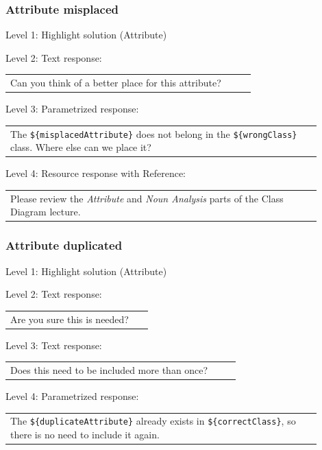 \subsubsection{Attribute misplaced}

\noindent Level 1: Highlight solution (Attribute) \medskip

\noindent Level 2: Text response: \medskip

\begin{tabular}{|p{0.9\linewidth}}
Can you think of a better place for this attribute?
\end{tabular} \medskip

\noindent Level 3: Parametrized response: \medskip

\begin{tabular}{|p{0.9\linewidth}}
The \verb|${misplacedAttribute}| does not belong in the \verb|${wrongClass}| class. Where else can we place it?
\end{tabular} \medskip

\noindent Level 4: Resource response with Reference: \medskip

\begin{tabular}{|p{0.9\linewidth}}
Please review the \textit{Attribute} and \textit{Noun Analysis} parts of the Class Diagram lecture.
\end{tabular} \medskip


\subsubsection{Attribute duplicated}

\noindent Level 1: Highlight solution (Attribute) \medskip

\noindent Level 2: Text response: \medskip

\begin{tabular}{|p{0.9\linewidth}}
Are you sure this is needed?
\end{tabular} \medskip

\noindent Level 3: Text response: \medskip

\begin{tabular}{|p{0.9\linewidth}}
Does this need to be included more than once?
\end{tabular} \medskip

\noindent Level 4: Parametrized response: \medskip

\begin{tabular}{|p{0.9\linewidth}}
The \verb|${duplicateAttribute}| already exists in \verb|${correctClass}|, so there is no need to include it again.
\end{tabular} \medskip

